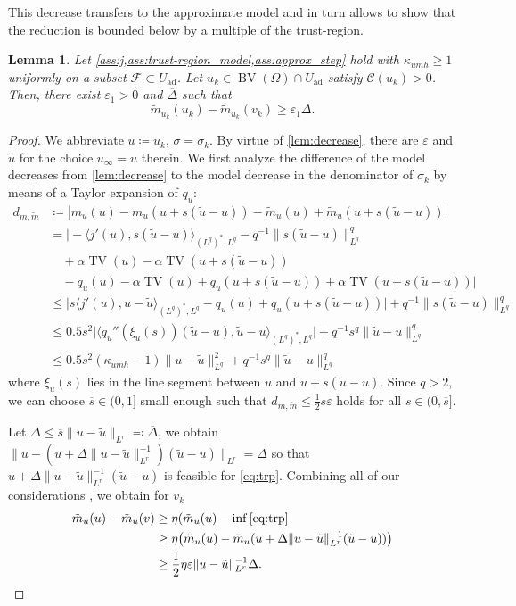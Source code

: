 \documentclass[11pt]{article}
\newcommand{\calC}{\mathcal{C}}
\newcommand{\calF}{\mathcal{F}}
\DeclareMathOperator*{\BV}{BV}
\DeclareMathOperator*{\TV}{TV}
\newcommand{\feas}{U_{\textrm{ad}}}
\newtheorem{lemma}[theorem]{Lemma}
\theoremstyle{definition}
\theoremstyle{remark}
\begin{document}
%
This decrease transfers to the approximate model and 
in turn allows to show that the reduction is
bounded below by a multiple of the trust-region.
%
\begin{lemma}\label{lem:reduction_bounded_below}
Let \cref{ass:j,ass:trust-region_model,ass:approx_step} hold with $\kappa_{umh} \ge 1$ uniformly on a subset $\calF \subset \feas$. Let $u_k \in \BV(\Omega) \cap \feas$ satisfy $\calC(u_k) > 0$.
Then, there exist $\varepsilon_1 > 0$ and
$\overline{\Delta}$
such that 
%
\[ \tilde{m}_{u_k}(u_k) - \tilde{m}_{u_k}(v_k)
\ge \varepsilon_1 \Delta. 
\]
\end{lemma}
\begin{proof}
We abbreviate $u \coloneqq u_k$, $\sigma = \sigma_k$. By virtue of \cref{lem:decrease},
there are $\varepsilon$ and $\tilde{u}$ for the choice $u_\infty = u$ therein. We first analyze
the difference of the model decreases from \cref{lem:decrease} to the model decrease in
the denominator of $\sigma_k$ by means of a Taylor expansion of $q_u$:
%
\begin{align*}
d_{m,\tilde{m}} &\coloneqq |m_u(u) - m_u(u + s(\tilde{u} - u))
- \tilde{m}_u(u) + \tilde{m}_u(u + s(\tilde{u} - u))|
\\
&= \Big|- \langle j'(u), s(\tilde{u} - u)\rangle_{(L^{q})^*,L^{q}} - q^{-1}\|s(\tilde{u} - u)\|_{L^{q}}^{q}\\
&\quad + \alpha \TV(u)
- \alpha \TV(u + s(\tilde{u} - u))\\
&\quad - q_u(u) - \alpha \TV(u)
+ q_u(u + s(\tilde{u} - u))
+ \alpha \TV(u + s(\tilde{u} - u))\Big|\\
&\le 
\big|
s \langle j'(u), u - \tilde{u} \rangle_{(L^q)^*,L^q} - q_u(u) + q_u(u + s(\tilde{u} - u)) \big|
+ q^{-1}\|s(\tilde{u} - u)\|_{L^q}^{q}\\
&\le  0.5 s^2 \big|\langle q_u''(\xi_u(s)) (\tilde{u} - u), \tilde{u} - u\rangle_{(L^{q})^*,L^{q}}\big|
+ q^{-1}s^q\|\tilde{u} - u\|_{L^{q}}^{q}  \\
&\le 0.5s^2(\kappa_{umh} - 1)\|u - \tilde{u}\|^2_{L^q} + q^{-1}s^q\|\tilde{u} - u\|_{L^{q}}^{q}
\end{align*}
%
where $\xi_u(s)$ lies in the line segment between $u$ and $u + s(\tilde{u} - u)$.
Since $q > 2$, we can choose $\overline{s} \in (0,1]$ small enough such that $d_{m,\tilde{m}} \le \frac{1}{2} s \varepsilon$
holds for all $s \in (0,\overline{s}]$.

Let $\Delta \le \overline{s}\|u - \tilde{u}\|_{L^r} \eqqcolon \overline{\Delta}$,
we obtain $\|u - (u + \Delta\|u - \tilde{u}\|_{L^r}^{-1})(\tilde{u} - u)\|_{L^r} = \Delta$ so
that $u + \Delta\|u - \tilde{u}\|_{L^r}^{-1}(\tilde{u} - u)$ is feasible for
\eqref{eq:trp}. Combining all of our considerations
, we obtain for $v_k$ 
%
\begin{align*}
\tilde{m}_u(u) - \tilde{m}_u(v)
&\ge \eta(\tilde{m}_u(u) - \inf \eqref{eq:trp} \\
&\ge \eta\big(\tilde{m}_u(u) - \tilde{m}_u(u
+ \Delta\|u - \tilde{u}\|_{L^r}^{-1}(\tilde{u} - u))\big) \\
&\ge \frac{1}{2}\eta\varepsilon\|u - \tilde{u}\|_{L^r}^{-1} \Delta.
\end{align*}
\end{proof}
\end{document}
